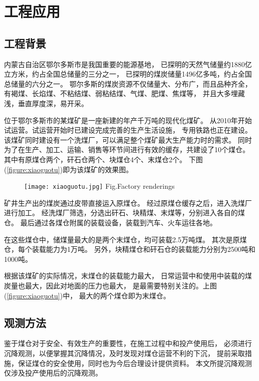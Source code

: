 
\chapter{工程应用}

\label{chap04}

\section{工程背景} 
内蒙古自治区鄂尔多斯市是我国重要的能源基地，
已探明的天然气储量约1880亿立方米，约占全国总储量的三分之一，
已探明的煤炭储量1496亿多吨，约占全国总储量的六分之一。
鄂尔多斯的煤炭资源不仅储量大、分布广，而且品种齐全，
有褐煤、长焰煤、不粘结煤、弱粘结煤、气煤、肥煤、焦煤等，
并且大多埋藏浅，垂直厚度深，易开采。

位于鄂尔多斯市的某煤矿是一座新建的年产千万吨的现代化煤矿。
从2010年开始试运营。试运营开始时已建设完成完善的生产生活设施，
专用铁路也正在建设。
该煤矿同时建设有一个洗煤厂，可以满足整个煤矿最大生产能力时的需求。
同时为了在生产、加工、运输、销售等环节间进行有效的缓存，共建设了10个煤仓。
其中有原煤仓两个，矸石仓两个、块煤仓4个、末煤仓2个。
下图(\ref{figure:xiaoguotu})即为该煤矿的效果图。
\begin{figure}[!h]
   \centering
   \texttt{[image: xiaoguotu.jpg]}
								{Fig.}{Factory renderings}
\end{figure}

矿井生产出的煤炭通过皮带直接运入原煤仓。
经过原煤仓缓存之后，进入洗煤厂进行加工。
经洗煤厂筛选，分选出矸石、块精煤、末煤等，分别进入各自的煤仓。
最后通过各煤仓附属的装载设备，装载到汽车、火车运往各地。

在这些煤仓中，储煤量最大的是两个末煤仓，均可装载2.5万吨煤。
其次是原煤仓，每个装载能力为1万吨。
另外，块精煤仓和矸石仓的装载能力分别为2500吨和1000吨。

根据该煤矿的实际情况，末煤仓的装载能力最大，
日常运营中和使用中装载的煤炭量也最大，因此对地面的压力也最大，
是最需要特别关注的。上图(\ref{figure:xiaoguotu})中，
最大的两个煤仓即为末煤仓。

\section{观测方法}
鉴于煤仓对于安全、有效生产的重要性，在施工过程中和投产使用后，
必须进行沉降观测，以便掌握其沉降情况，及时发现对煤仓运营不利的下沉，
提前采取措施，保证煤仓的安全使用，同时也为今后合理设计提供资料。
本文所提沉降观测仅涉及投产使用后的沉降观测。

